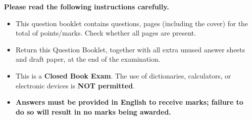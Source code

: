 \documentclass[12pt, a4paper, answers, addpoints]{exam}
\begin{document}
\vspace{0.5cm}

\noindent
\textbf{Please read the following instructions carefully.}
\begin{itemize}[leftmargin=*]
    \item This question booklet contains \textbf{\numquestions} questions, \textbf{\numpages} pages (including the cover) for the total of \textbf{\numpoints} points/marks. Check whether all pages are present.
    
    \item Return this Question Booklet, together with all extra unused answer sheets and draft paper, at the end of the examination.
    
    \item This is a \textbf{Closed Book Exam}. The use of dictionaries, calculators, or electronic devices is \textbf{NOT permitted}.
    
    \item \textbf{Answers must be provided in English to receive marks; failure to do so will result in no marks being awarded.}

\end{itemize}


\vfill
\end{document}
